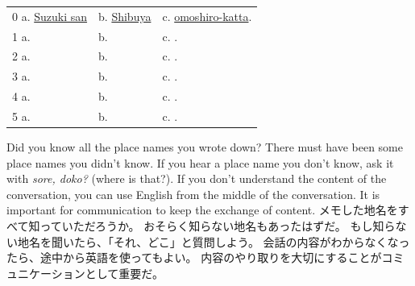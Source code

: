 \documentclass[uplatex,dvipdfmx,b5paper,english,10pt]{jsbook}
\begin{document}
\begin{tabular}[t]{lll}
 0 a. \underline{ Suzuki san\hspace{2.5zw}}
 & b. \underline{ Shibuya\hspace{3.9zw}}
 & c. \underline{ omoshiro-katta\hspace{2.6zw}}.\\
 1 a. \underline{\hspace{8zw}}& b. \underline{\hspace{8zw}} & c. \underline{\hspace{10zw}}.\\
 2 a. \underline{\hspace{8zw}}& b. \underline{\hspace{8zw}} & c. \underline{\hspace{10zw}}.\\
 3 a. \underline{\hspace{8zw}}& b. \underline{\hspace{8zw}} & c. \underline{\hspace{10zw}}.\\
 4 a. \underline{\hspace{8zw}}& b. \underline{\hspace{8zw}} & c. \underline{\hspace{10zw}}.\\
 5 a. \underline{\hspace{8zw}}& b. \underline{\hspace{8zw}} & c. \underline{\hspace{10zw}}.\\
\end{tabular}

\begin{toianswer}
\ifEnglish
Did you know all the place names you wrote down?
There must have been some place names you didn't know.
If you hear a place name you don't know, ask it with {\it sore, doko?\/} (where is that?).
If you don't understand the content of the conversation, you can use English from the middle of the conversation.
It is important for communication to keep the exchange of content.
\else
メモした地名をすべて知っていただろうか。
おそらく知らない地名もあったはずだ。
もし知らない地名を聞いたら、「それ、どこ」と質問しよう。
会話の内容がわからなくなったら、途中から英語を使ってもよい。
内容のやり取りを大切にすることがコミュニケーションとして重要だ。
\fi
\end{toianswer}
\end{document}

